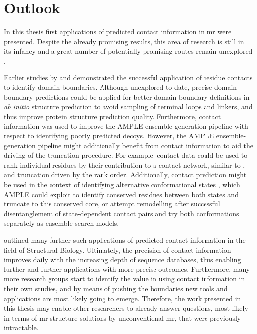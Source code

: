 \section{Outlook}
In this thesis first applications of predicted contact information in \gls{mr} were presented. Despite the already promising results, this area of research is still in its infancy and a great number of potentially promising routes remain unexplored \cite{Simkovic2017-xs}. 

Earlier studies by \textcite{Rigden2002-mf} and \textcite{Sadowski2013-zu} demonstrated the successful application of residue contacts to identify domain boundaries. Although unexplored to-date, precise domain boundary predictions could be applied for better domain boundary definitions in \textit{ab initio} structure prediction to avoid sampling of terminal loops and linkers, and thus improve protein structure prediction quality. Furthermore, contact information was used to improve the AMPLE ensemble-generation pipeline with respect to identifying poorly predicted decoys. However, the AMPLE ensemble-generation pipeline might additionally benefit from contact information to aid the driving of the truncation procedure. For example, contact data could be used to rank individual residues by their contribution to a contact network, similar to \cite{Parente2015-mv}, and truncation driven by the rank order. Additionally, contact prediction might be used in the context of identifying alternative conformational states \cite{Hopf2012-zl,Jana2014-rw,Sfriso2016-ml,Morcos2013-ks, Sutto2015-ck}, which AMPLE could exploit to identify conserved residues between both states and truncate to this conserved core, or attempt remodelling after successful disentanglement of state-dependent contact pairs and try both conformations separately as ensemble search models. 

\textcite{Simkovic2017-xs} outlined many further such applications of predicted contact information in the field of Structural Biology. Ultimately, the precision of contact information improves daily with the increasing depth of sequence databases, thus enabling further and further applications with more precise outcomes. Furthermore, many more research groups start to identify the value in using contact information in their own studies, and by means of pushing the boundaries new tools and applications are most likely going to emerge. Therefore, the work presented in this thesis may enable other researchers to already answer questions, most likely in terms of \gls{mr} structure solutions by unconventional \gls{mr}, that were previously intractable.
